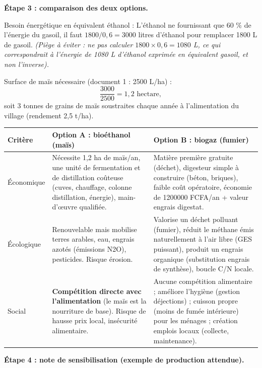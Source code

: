 \documentclass[11pt]{article}
\begin{document}
\begin{exoresolu}
\textbf{Étape 3 : comparaison des deux options.}

Besoin énergétique en équivalent éthanol :
L'éthanol ne fournissant que 60 \% de l'énergie du gasoil, il faut $1800 / 0{,}6 = \num{3000}$ litres d'éthanol pour remplacer \num{1800} L de gasoil.
\emph{(Piège à éviter : ne pas calculer $1800 \times 0,6 = 1080$ L, ce qui correspondrait à l'énergie de 1080 L d'éthanol exprimée en équivalent gasoil, et non l'inverse).}

Surface de maïs nécessaire (document 1 : \num{2500} L/ha) :
\[ \frac{3000}{2500} = 1{,}2 \text{ hectare}, \]
soit 3 tonnes de grains de maïs soustraites chaque année à l'alimentation du village (rendement 2,5 t/ha).

\begin{center}
\begin{tabularx}{\linewidth}{|l|X|X|}\hline
\rowcolor{popblueL} \textbf{Critère} & \textbf{Option A : bioéthanol (maïs)} & \textbf{Option B : biogaz (fumier)} \\ \hline
Économique & Nécessite 1,2 ha de maïs/an, une unité de fermentation et de distillation coûteuse (cuves, chauffage, colonne distillation, énergie), main-d'œuvre qualifiée. & Matière première gratuite (déchet), digesteur simple à construire (béton, briques), faible coût opératoire, économie de \num{1200000} FCFA/an + valeur engrais digestat. \\ \hline
Écologique & Renouvelable mais mobilise terres arables, eau, engrais azotés (émissions N2O), pesticides. Risque érosion. & Valorise un déchet polluant (fumier), réduit le méthane émis naturellement à l'air libre (GES puissant), produit un engrais organique (substitution engrais de synthèse), boucle C/N locale. \\ \hline
Social & \textbf{Compétition directe avec l'alimentation} (le maïs est la nourriture de base). Risque de hausse prix local, insécurité alimentaire. & Aucune compétition alimentaire ; améliore l'hygiène (gestion déjections) ; cuisson propre (moins de fumée intérieure) pour les ménages ; création emplois locaux (collecte, maintenance). \\ \hline
\end{tabularx}
\end{center}

\textbf{Étape 4 : note de sensibilisation (exemple de production attendue).}


\end{exoresolu}
\end{document}
